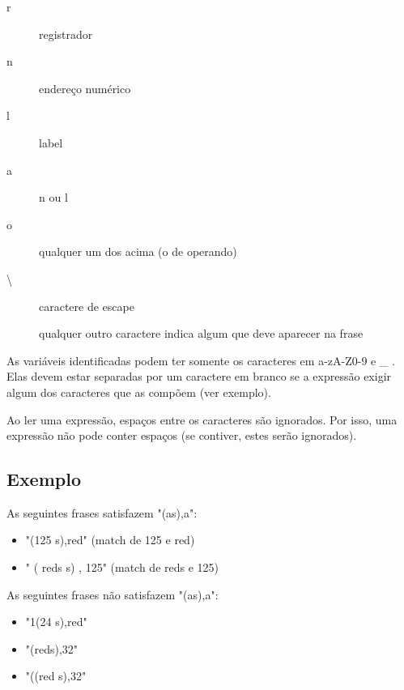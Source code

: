 \documentclass[a4paper,10pt]{article}
\begin{document}
\begin{description}
	\item [r] registrador 
	\item [n] endereço numérico 
	\item [l] label 
	\item [a] n ou l 
	\item [o] qualquer um dos acima (o de operando) 
	\item [\textbackslash] caractere de escape 
	\item [] qualquer outro caractere indica algum que deve aparecer na frase
\end{description}

As variáveis identificadas podem ter somente os caracteres em a-zA-Z0-9 e \_ . Elas devem estar separadas por um caractere em branco se a expressão exigir algum dos caracteres que as compõem (ver exemplo). 

Ao ler uma expressão, espaços entre os caracteres são ignorados. Por isso, uma expressão não pode conter espaços (se contiver, estes serão ignorados).

	\subsection{Exemplo}
	As seguintes frases satisfazem "(as),a":
	\begin{itemize}
		\item "(125 s),red" (match de 125 e red) 
		\item " ( reds s) , 125" (match de reds e 125)
	\end{itemize}
	
	As seguintes frases não satisfazem "(as),a": 
	\begin{itemize}
		\item "1(24 s),red" 
		\item "(reds),32" 
		\item "((red s),32"
	\end{itemize}
\end{document}
